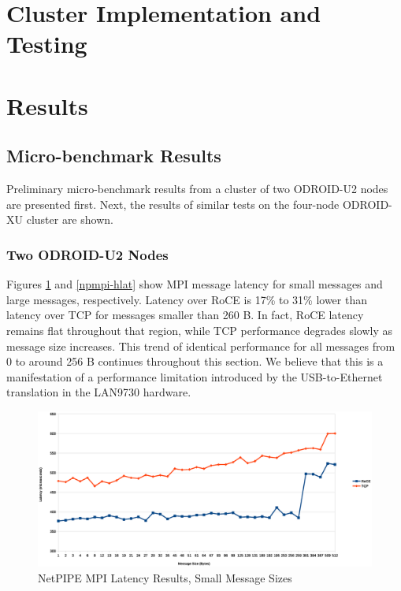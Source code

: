 \documentclass[a4paper]{article}
\begin{document}
\newpage
\section{\textbf{Cluster Implementation and Testing}}
\label{cluster}

\newpage
\section{\textbf{Results}}
\label{results}

\subsection{\textbf{Micro-benchmark Results}}

Preliminary micro-benchmark results from a cluster of two ODROID-U2 nodes are
presented first. Next, the results of similar tests on the four-node ODROID-XU
cluster are shown.

\subsubsection{\textbf{Two ODROID-U2 Nodes}}

Figures \ref{npmpi-llat} and \ref{npmpi-hlat} show MPI message latency for small
messages and large messages, respectively. Latency over RoCE is 17\% to 31\%
lower than latency over TCP for messages smaller than 260 B. In fact, RoCE
latency remains flat throughout that region, while TCP performance degrades
slowly as message size increases. This trend of identical performance for all
messages from 0 to around 256 B continues throughout this section. We believe
that this is a manifestation of a performance limitation introduced by the
USB-to-Ethernet translation in the LAN9730 hardware.

\begin{figure}[H]
\includegraphics[width=\textwidth]{netpipe_lat_small}
\caption{NetPIPE MPI Latency Results, Small Message Sizes}
\label{npmpi-llat}
\end{figure}
\end{document}
